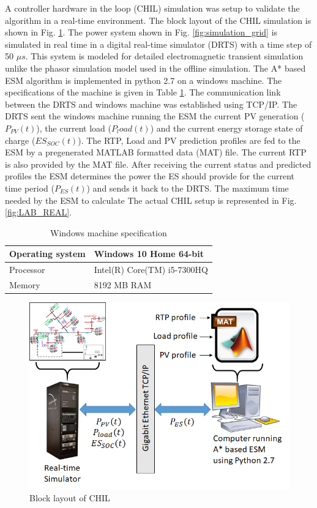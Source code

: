 A controller hardware in the loop (CHIL) simulation was setup to validate the algorithm in a real-time environment. 
The block layout of the CHIL simulation is shown in Fig. \ref{fig:RT_block}. The power system shown in Fig. \ref{fig:simulation_grid} is simulated in real time in a digital real-time simulator (DRTS) with a time step of 50 ${\mu}s$. This system is modeled for detailed electromagnetic transient simulation unlike the phasor simulation model used in the offline simulation. The A* based ESM algorithm is implemented in python 2.7 on a windows machine. The specifications of the machine is given in Table \ref{tab:PC}. The communication link between the DRTS and windows machine was established using TCP/IP. The DRTS sent the windows machine running the ESM the current PV generation ($P_{PV}(t)$), the current load ($P_load(t)$) and the current energy storage state of charge ($ES_{SOC}(t)$). The RTP, Load and PV prediction profiles are fed to the ESM by a pregenerated MATLAB formatted data (MAT) file. The current RTP is also provided by the MAT file. After receiving the current status and predicted profiles the ESM determines the power the ES should provide for the current time period ($P_{ES}(t)$) and sends it back to the DRTS. The maximum time needed by the ESM to calculate The actual CHIL setup is represented in Fig. \ref{fig:LAB_REAL}. 

\begin{table}[htb]
\caption{Windows machine specification}
\label{tab:PC}
\centering
\begin{tabular}{|l|l|}
\hline
Operating system & Windows 10 Home 64-bit      \\ \hline
Processor        & Intel(R) Core(TM) i5-7300HQ \\ \hline
Memory           & 8192 MB RAM                 \\ \hline
\end{tabular}
\end{table}

\begin{figure}[!ht]
    \centering
    \includegraphics[width = \linewidth]{figs/RT_block.png}
    \caption{Block layout of CHIL}
    \label{fig:RT_block}
\end{figure}





